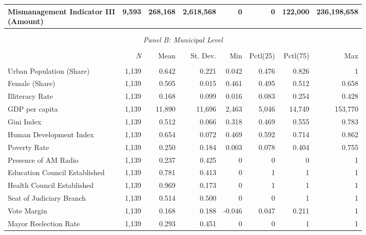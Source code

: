 \documentclass[border = 1pt]{standalone}
\begin{document}
\begin{tabular}{@{\extracolsep{6pt}}lrrrrrrr}
\makecell[cl]{Mismanagement Indicator III \\ \hspace{4pt}(Amount)}                       & 9,593 & 268,168 & 2,618,568 & 0  & 0      & 122,000 & 236,198,658 \\[1.0ex]
\hline \\[-1.8ex]
\multicolumn{8}{c}{}\\
\multicolumn{8}{c}{\emph{Panel B: Municipal Level}} \\
\hline \\[-1.8ex]
& \multicolumn{1}{r}{\emph{N}} & \multicolumn{1}{r}{Mean} & \multicolumn{1}{r}{St. Dev.} & \multicolumn{1}{r}{Min} & \multicolumn{1}{r}{Pctl(25)} & \multicolumn{1}{r}{Pctl(75)} & \multicolumn{1}{r}{Max} \\
\hline \\[-1.8ex]
Urban Population (Share)      & 1,139 & 0.642 & 0.221 & 0.042 & 0.476 & 0.826 & 1       \\[1.0ex]
Female (Share)                & 1,139 & 0.505 & 0.015 & 0.461 & 0.495 & 0.512 & 0.658   \\[1.0ex]
Illiteracy Rate               & 1,139 & 0.168 & 0.099 & 0.016 & 0.083 & 0.254 & 0.428   \\[1.0ex]
GDP per capita                & 1,139 & 11,890& 11,696& 2,463 & 5,046 & 14,749& 153,770 \\[1.0ex]
Gini Index                    & 1,139 & 0.512 & 0.066 & 0.318 & 0.469 & 0.555 & 0.783   \\[1.0ex]
Human Development Index       & 1,139 & 0.654 & 0.072 & 0.469 & 0.592 & 0.714 & 0.862   \\[1.0ex]
Poverty Rate                  & 1,139 & 0.250 & 0.184 & 0.003 & 0.078 & 0.404 & 0.755   \\[1.0ex]
Presence of AM Radio          & 1,139 & 0.237 & 0.425 & 0     & 0     & 0     & 1       \\[1.0ex]
Education Council Established & 1,139 & 0.781 & 0.413 & 0     & 1     & 1     & 1       \\[1.0ex]
Health Council Established    & 1,139 & 0.969 & 0.173 & 0     & 1     & 1     & 1       \\[1.0ex]
Seat of Judiciary Branch      & 1,139 & 0.514 & 0.500 & 0     & 0     & 1     & 1       \\[1.0ex]
Vote Margin                   & 1,139 & 0.168 & 0.188 & -0.046& 0.047 & 0.211 & 1       \\[1.0ex]
Mayor Reelection Rate         & 1,139 & 0.293 & 0.451 & 0     & 0     & 1     & 1       \\[1.0ex]

\end{tabular}
\end{document}
